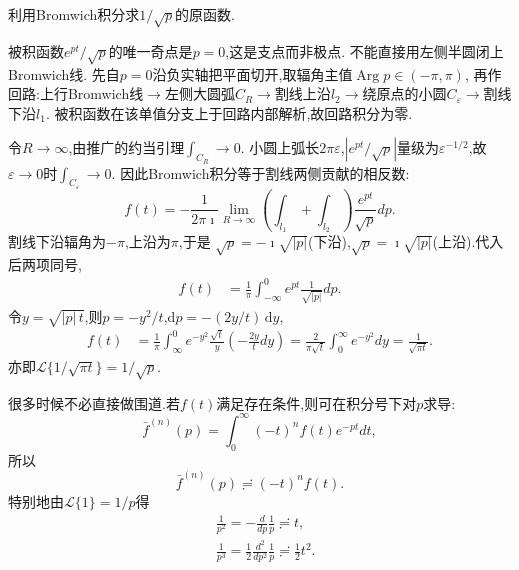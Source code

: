 \begin{example}
利用Bromwich积分求$1/\sqrt{p}$的原函数.
\end{example}
\begin{solution}
被积函数$e^{pt}/\sqrt{p}$的唯一奇点是$p=0$,这是支点而非极点.
不能直接用左侧半圆闭上Bromwich线.
先自$p=0$沿负实轴把平面切开,取辐角主值$\operatorname{Arg}p\in(-\pi,\pi)$,
再作回路:上行Bromwich线$\to$左侧大圆弧$C_R\to$割线上沿$l_2\to$绕原点的小圆$C_\varepsilon\to$割线下沿$l_1$.
被积函数在该单值分支上于回路内部解析,故回路积分为零.

令$R\to\infty$,由推广的约当引理$\int_{C_R}\to 0$.
小圆上弧长$2\pi\varepsilon$,$|e^{pt}/\sqrt{p}|$量级为$\varepsilon^{-1/2}$,故$\varepsilon\to 0$时$\int_{C_\varepsilon}\to 0$.
因此Bromwich积分等于割线两侧贡献的相反数:
\begin{equation}
f(t)=-\frac{1}{2 \pi \imath} \lim _{R \rightarrow \infty}\left(\int_{l_1}+\int_{l_2}\right) \frac{e^{p t}}{\sqrt{p}} d p .
\end{equation}
割线下沿辐角为$-\pi$,上沿为$\pi$,于是
$\sqrt{p}=-\imath\sqrt{|p|}$(下沿),$\sqrt{p}=\imath\sqrt{|p|}$(上沿).代入后两项同号,
\begin{equation}
\begin{aligned}
f(t)
& =\frac{1}{\pi} \int_{-\infty}^0 e^{p t} \frac{1}{\sqrt{|p|}} d p .
\end{aligned}
\end{equation}
令$y=\sqrt{|p|\,t}$,则$p=-y^2/t$,$\mathrm{d}p=-(2y/t)\,\mathrm{d}y$,
\begin{equation}
\begin{aligned}
f(t)
& =\frac{1}{\pi} \int_{\infty}^0 e^{-y^2} \frac{\sqrt{t}}{y}\left(-\frac{2 y}{t} d y\right)
 =\frac{2}{\pi \sqrt{t}} \int_0^{\infty} e^{-y^2} d y
 =\frac{1}{\sqrt{\pi t}} .
\end{aligned}
\end{equation}
亦即$\mathcal{L}\{1/\sqrt{\pi t}\}=1/\sqrt{p}$.
\end{solution}

很多时候不必直接做围道.若$f(t)$满足存在条件,则可在积分号下对$p$求导:
\begin{equation}
\bar{f}^{(n)}(p)=\int_0^{\infty}(-t)^n f(t) e^{-p t} d t,
\end{equation}
所以
\begin{equation}
    \bar{f}^{(n)}(p)\risingdotseq (-t)^n f(t).
\end{equation}
特别地由$\mathcal{L}\{1\}=1/p$得
\[
    \begin{aligned}
    & \frac{1}{p^2}=-\frac{d}{d p} \frac{1}{p} \risingdotseq  t, \\
    & \frac{1}{p^3}=\frac{1}{2} \frac{d^2}{d p^2} \frac{1}{p} \risingdotseq \frac{1}{2} t^2 .
    \end{aligned}
\]

